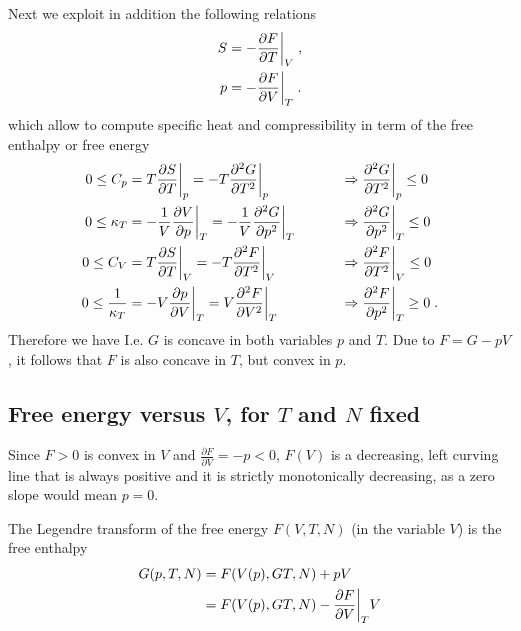 Next we exploit in addition the following relations 
%
\begin{align}\label{eq:}
S &=-\frac{\partial F}{\partial T}\bigg|_{V}\;,\\
p &=-\frac{\partial F}{\partial V}\bigg|_{T}\;.
\end{align}
%
which allow to compute specific heat and compressibility in term of the free enthalpy or free energy
%
\begin{align}\label{eq}
0\le C_{p}&= T \frac{\partial S}{\partial T}\bigg|_{p} =-T 
\frac{\partial^{2} G}{\partial T^{2}}\bigg|_{p}\;\quad &&\Rightarrow \frac{\partial^{2} G}{\partial T^{2}}\bigg|_{p}\le 0\\
0\le \kappa_{T} &= -\frac{1}{V}\frac{\partial V}{\partial p}\bigg|_{T}  =-\frac{1}{V}\frac{\partial^{2} G}{\partial p^{2}}\bigg|_{T}\;\qquad&&\Rightarrow\frac{\partial^{2} G}{\partial p^{2}}\bigg|_{T}\le 0\\
0\le C_{V}&= T \frac{\partial S}{\partial T}\bigg|_{V} =
-T \frac{\partial^{2} F}{\partial T^{2}}\bigg|_{V}\;\quad &&\Rightarrow \frac{\partial^{2} F}{\partial T^{2}}\bigg|_{V}\le 0\\
0\le \frac{1}{\kappa_{T}} &= -V \frac{\partial p}{\partial V}\bigg|_{T}  
=V \frac{\partial^{2} F}{\partial V^{2}}\bigg|_{T}\;\qquad&&\Rightarrow\frac{\partial^{2} F}{\partial p^{2}}\bigg|_{T}\ge 0\;.
\end{align}
%
Therefore we have
%
I.e. $G$ is concave in both variables $p$ and $T$. Due to $F=G-pV$, it follows that
$F$ is also concave in $T$, but convex in $p$.

\newpage

\subsection{Free energy versus $V$, for $T$ and $N$ fixed}
Since $F>0$ is convex in $V$ and $\frac{\partial F}{\partial V}=-p<0$, $F(V)$  is a decreasing,   left curving line that is always positive and it is strictly monotonically decreasing, as a zero slope  would mean $p=0$. 

The Legendre transform of the free energy $F(V,T,N)$ (in the variable $V$) is the free enthalpy %
\begin{align*}
G(p,T,N) &= F(V(p),GT,N) + p V \\
&= F(V(p),GT,N) - \frac{\partial  F}{\partial V}\bigg|_{T} V
\end{align*}
%


